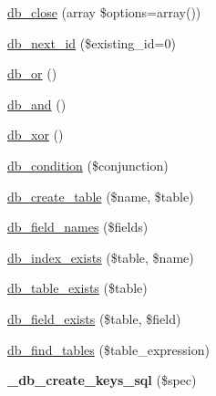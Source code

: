 \begin{DoxyCompactItemize}
\item 
\hyperlink{group__database_ga3ee89e12a6f70888bfe4ac30f89df442}{db\_\-close} (array \$options=array())
\item 
\hyperlink{group__database_gab0a2cb3e94525a74407740043b821c5b}{db\_\-next\_\-id} (\$existing\_\-id=0)
\item 
\hyperlink{group__database_ga1a7695a360b8c2219fe1998dfc272080}{db\_\-or} ()
\item 
\hyperlink{group__database_ga39ab6e9c3b5316eb4d8fe8f52af91acc}{db\_\-and} ()
\item 
\hyperlink{group__database_ga85bb17ee005f930dd2caa93f0752d0e8}{db\_\-xor} ()
\item 
\hyperlink{group__database_ga7e591c732d1eb7da6813ef79867a9859}{db\_\-condition} (\$conjunction)
\item 
\hyperlink{group__schemaapi_gaf3a8307693d6b28374665c72531b429f}{db\_\-create\_\-table} (\$name, \$table)
\item 
\hyperlink{group__schemaapi_gaeb423ba53e5133548abe3d999f86e787}{db\_\-field\_\-names} (\$fields)
\item 
\hyperlink{group__schemaapi_ga0c10c365922d538e4d5d17fb314d4b79}{db\_\-index\_\-exists} (\$table, \$name)
\item 
\hyperlink{group__schemaapi_ga78809300cee80db034832825aed55b70}{db\_\-table\_\-exists} (\$table)
\item 
\hyperlink{group__schemaapi_ga6b39d7c0876ab53b1588ff9e40677c42}{db\_\-field\_\-exists} (\$table, \$field)
\item 
\hyperlink{group__schemaapi_gac723bfddd5f133eb4d3dcec84c3c3f3c}{db\_\-find\_\-tables} (\$table\_\-expression)
\item 
\hypertarget{group__schemaapi_gaa4be538758cb8279d3aeed18e1b25c2d}{
{\bfseries \_\-db\_\-create\_\-keys\_\-sql} (\$spec)}
\label{group__schemaapi_gaa4be538758cb8279d3aeed18e1b25c2d}


\end{DoxyCompactItemize}
